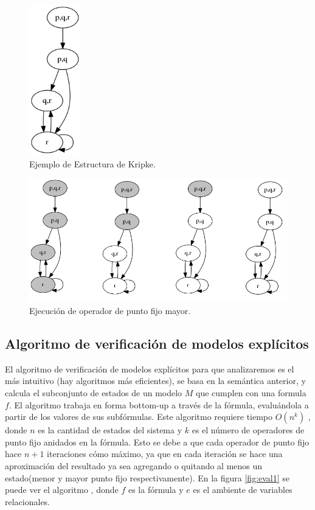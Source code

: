 \begin{figure}[h!]
  \centering
  \includegraphics[width=0.2\textwidth]{Figures/kripke3.png}
  \caption{Ejemplo de Estructura de Kripke.} 
  \label{fig:kripke3}
\end{figure}
\begin{figure}[H]
  \centering
  \includegraphics[width=1\textwidth]{Figures/kripke3-gfp1.png}
  \caption{Ejecución de operador de punto fijo mayor.} 
  \label{fig:kripke3-gfp1}
\end{figure}

\subsection{Algoritmo de verificación de modelos explícitos}

El algoritmo de verificación de modelos explícitos para {\mucalculo} que analizaremos es el más intuitivo (hay algoritmos más eficientes), se basa en la semántica anterior, y calcula el subconjunto de estados de un modelo $M$ que cumplen con una formula $f$. El algoritmo trabaja en forma bottom-up a través de la fórmula, evaluándola a partir de los valores de sus subfórmulas. Este algoritmo requiere tiempo $O(n^{k})$ \cite{Clarke:1}, donde $n$ es la cantidad de estados del sistema y $k$ es el número de operadores de punto fijo anidados en la fórmula. Esto se debe a que cada operador de punto fijo hace $n+1$ iteraciones cómo máximo, ya que en cada iteración se hace una aproximación del resultado ya sea agregando o quitando al menos un estado(menor y mayor punto fijo respectivamente). En la figura \ref{fig:eval1} se puede ver el algoritmo , donde $f$ es la fórmula y $e$ es el ambiente de variables relacionales.

